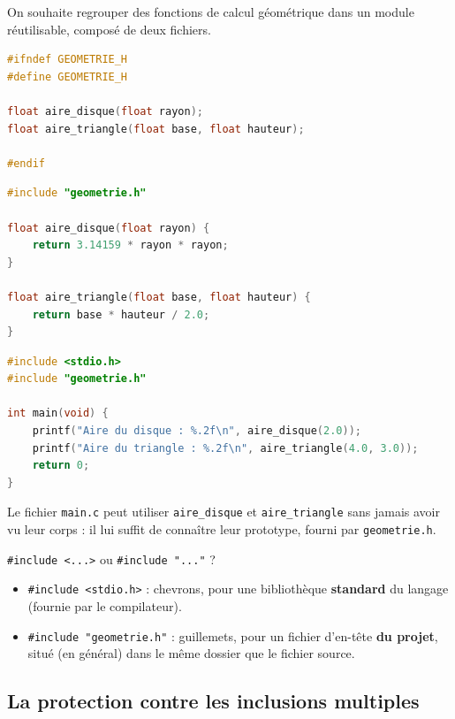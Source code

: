 On souhaite regrouper des fonctions de calcul géométrique dans un module réutilisable, composé de deux fichiers.

\begin{lstlisting}[language=c,caption={\texttt{geometrie.h} : les déclarations}]
#ifndef GEOMETRIE_H
#define GEOMETRIE_H

float aire_disque(float rayon);
float aire_triangle(float base, float hauteur);

#endif
\end{lstlisting}

\begin{lstlisting}[language=c,caption={\texttt{geometrie.c} : les définitions}]
#include "geometrie.h"

float aire_disque(float rayon) {
    return 3.14159 * rayon * rayon;
}

float aire_triangle(float base, float hauteur) {
    return base * hauteur / 2.0;
}
\end{lstlisting}

\begin{lstlisting}[language=c,caption={\texttt{main.c} : utilisation du module}]
#include <stdio.h>
#include "geometrie.h"

int main(void) {
    printf("Aire du disque : %.2f\n", aire_disque(2.0));
    printf("Aire du triangle : %.2f\n", aire_triangle(4.0, 3.0));
    return 0;
}
\end{lstlisting}

Le fichier \texttt{main.c} peut utiliser \texttt{aire\_disque} et \texttt{aire\_triangle} sans jamais avoir vu leur corps : il lui suffit de connaître leur prototype, fourni par \texttt{geometrie.h}.

\begin{UPSTIwarning}{\texttt{\#include <...>} ou  \texttt{\#include "..."} ?}
  \begin{itemize}
    \item \texttt{\#include <stdio.h>} : chevrons, pour une bibliothèque \textbf{standard} du langage (fournie par le compilateur).
    \item \texttt{\#include "geometrie.h"} : guillemets, pour un fichier d'en-tête \textbf{du projet}, situé (en général) dans le même dossier que le fichier source.
  \end{itemize}
\end{UPSTIwarning}

\subsection{La protection contre les inclusions multiples}

